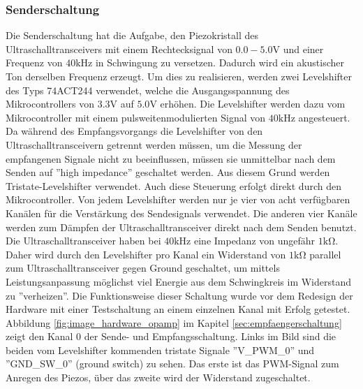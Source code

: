 \subsubsection{Senderschaltung}\label{sec:senderschaltung}
Die Senderschaltung hat die Aufgabe, den Piezokristall des Ultraschalltransceivers mit einem Rechtecksignal von $0.0 - 5.0 \mathrm{V}$ und einer Frequenz von $40 \mathrm{kHz}$ in Schwingung zu versetzen. Dadurch wird ein akustischer Ton derselben Frequenz erzeugt. Um dies zu realisieren, werden zwei Levelshifter des Typs 74ACT244 verwendet, welche die Ausgangsspannung des Mikrocontrollers von $3.3 \mathrm{V}$ auf $5.0 \mathrm{V}$ erhöhen. Die Levelshifter werden dazu vom Mikrocontroller mit einem pulsweitenmodulierten Signal von $40 \mathrm{kHz}$ angesteuert. Da während des Empfangsvorgangs die Levelshifter von den Ultraschalltransceivern getrennt werden müssen, um die Messung der empfangenen Signale nicht zu beeinflussen, müssen sie unmittelbar nach dem Senden auf ''high impedance'' geschaltet werden. Aus diesem Grund werden Tristate-Levelshifter verwendet. Auch diese Steuerung erfolgt direkt durch den Mikrocontroller. Von jedem Levelshifter werden nur je vier von acht verfügbaren Kanälen für die Verstärkung des Sendesignals verwendet. Die anderen vier Kanäle werden zum Dämpfen der Ultraschalltransceiver direkt nach dem Senden benutzt. Die Ultraschalltransceiver haben bei $40 \mathrm{kHz}$ eine Impedanz von ungefähr $1 \mathrm{k \Omega}$. Daher wird durch den Levelshifter pro Kanal ein Widerstand von $1 \mathrm{k \Omega}$ parallel zum Ultraschalltransceiver gegen Ground geschaltet, um mittels Leistungsanpassung möglichst viel Energie aus dem Schwingkreis im Widerstand zu ''verheizen''. Die Funktionsweise dieser Schaltung wurde vor dem Redesign der Hardware mit einer Testschaltung an einem einzelnen Kanal mit Erfolg getestet. Abbildung \ref{fig:image_hardware_opamp} im Kapitel \ref{sec:empfaengerschaltung} zeigt den Kanal $0$ der Sende- und Empfangsschaltung. Links im Bild sind die beiden vom Levelshifter kommenden tristate Signale ''V\_PWM\_0'' und ''GND\_SW\_0'' (ground switch) zu sehen. Das erste ist das PWM-Signal zum Anregen des Piezos, über das zweite wird der Widerstand zugeschaltet.



